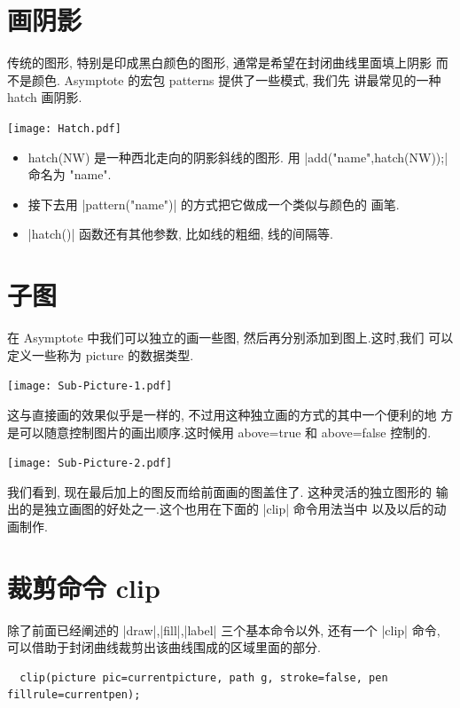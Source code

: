 \documentclass[nofonts,CJKnormalspaces]{ctexbook}
\begin{document}
\section{画阴影}
传统的图形, 特别是印成黑白颜色的图形, 通常是希望在封闭曲线里面填上阴影
而不是颜色. Asymptote 的宏包 {patterns} 提供了一些模式, 我们先
讲最常见的一种 hatch 画阴影.
\begin{center}\texttt{[image: Hatch.pdf]}\end{center}%

\begin{itemize}
\item {hatch(NW)} 是一种西北走向的阴影斜线的图形. 用
  |add("name",hatch(NW));| 命名为 "name".
\item 接下去用 |pattern("name")| 的方式把它做成一个类似与颜色的
  画笔.
\item |hatch()| 函数还有其他参数, 比如线的粗细, 线的间隔等.
\end{itemize}

\section{子图}
在 Asymptote 中我们可以独立的画一些图, 然后再分别添加到图上.这时,我们
可以定义一些称为 {picture} 的数据类型.
\begin{center}\texttt{[image: Sub-Picture-1.pdf]}\end{center}%


这与直接画的效果似乎是一样的, 不过用这种独立画的方式的其中一个便利的地
方是可以随意控制图片的画出顺序.这时候用 {above=true} 和 {above=false}
控制的.
\begin{center}\texttt{[image: Sub-Picture-2.pdf]}\end{center}%


我们看到, 现在最后加上的图反而给前面画的图盖住了. 这种灵活的独立图形的
输出的是独立画图的好处之一.这个也用在下面的 |clip| 命令用法当中
以及以后的动画制作.

\section{裁剪命令 clip}
除了前面已经阐述的 |draw|,|fill|,|label| 三个基本命令以外, 还有一个
|clip| 命令, 可以借助于封闭曲线裁剪出该曲线围成的区域里面的部分.
\begin{lstlisting}
  clip(picture pic=currentpicture, path g, stroke=false, pen fillrule=currentpen);
\end{lstlisting}
\end{document}
